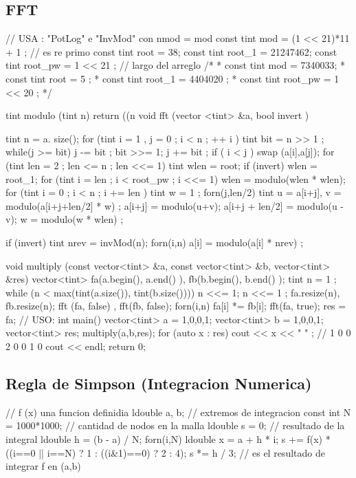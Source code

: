 \subsection{FFT}
\begin{code}
// USA : "PotLog" e "InvMod" con nmod = mod 
const tint mod = (1 << 21)*11 + 1 ; // es re primo
const tint root = 38;
const tint root_1 = 21247462;
const tint root_pw = 1 << 21 ; // largo del arreglo
/*
 * const tint mod = 7340033;
 * const tint root = 5 ;
 * const tint root_1 = 4404020 ;
 * const tint root_pw = 1 << 20 ; 
 */
 
tint modulo (tint n)
{
	return ((n %
}
void fft (vector <tint> &a, bool invert )
{
	tint n = a. size();
	for (tint i = 1 , j = 0 ; i < n ; ++ i )
	{
		tint bit = n >> 1 ;
		while(j >= bit)
		{
			j -= bit ;
			bit >>= 1;
		}
		j += bit ;
		if ( i < j )
			swap (a[i],a[j]);
	}
	for (tint len = 2 ; len <= n ; len <<= 1) 
	{
		tint wlen = root;
		if (invert)
			wlen = root_1;
		for (tint i = len ; i < root_pw ; i <<= 1)
			wlen = modulo(wlen * wlen);
		for (tint i = 0 ; i < n ; i += len ) 
		{
			tint w = 1 ;
			forn(j,len/2)
			{
				tint u = a[i+j], v = modulo(a[i+j+len/2] * w) ;
				a[i+j] = modulo(u+v);
				a[i+j + len/2] = modulo(u - v);
				w = modulo(w * wlen) ;
			}
		}
	}
	
	if (invert) 
	{
		tint nrev = invMod(n);
		forn(i,n)
			a[i] = modulo(a[i] * nrev) ;
	}
}

void multiply (const vector<tint> &a, const vector<tint> &b, vector<tint> &res) 
{
	vector<tint> fa(a.begin(), a.end() ), fb(b.begin(), b.end() );
	tint n = 1 ;
	while (n < max(tint(a.size()), tint(b.size())))
		n <<= 1;
	n <<= 1 ;
	fa.resize(n), fb.resize(n);
	fft (fa, false) , fft(fb, false);
	forn(i,n)
		fa[i] *= fb[i];
	fft(fa, true);
	res = fa;
} 
// USO:
int main()
{
	vector<tint> a = {1,0,0,1};
	vector<tint> b = {1,0,0,1};
	vector<tint> res;
	multiply(a,b,res);
	for (auto x : res)
		cout << x << " " ; // 1 0 0 2 0 0 1 0 
	cout << endl;
	return 0;
}

\end{code}

\subsection{Regla de Simpson (Integracion Numerica)}
\begin{code}
// f (x) una funcion definidia
ldouble a, b; // extremos de integracion
const int N = 1000*1000; // cantidad de nodos en la malla
ldouble s = 0; // resultado de la integral
ldouble h = (b - a) / N;
forn(i,N)
{
	ldouble x = a + h * i;
	s += f(x) * ((i==0 || i==N) ? 1 : ((i&1)==0) ? 2 : 4);
}
s *= h / 3; // es el resultado de integrar f en (a,b)
\end{code}
